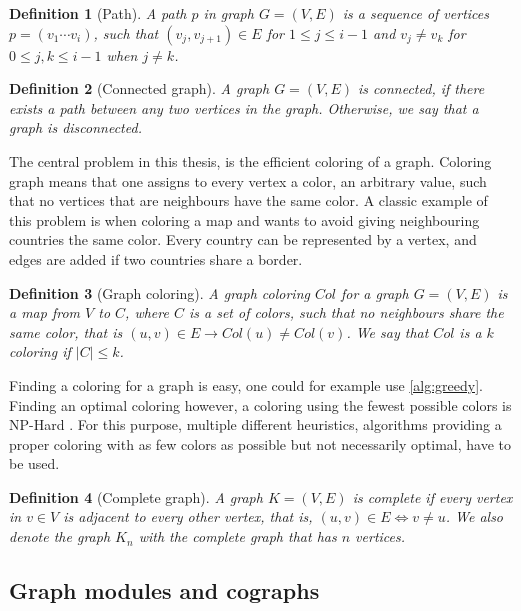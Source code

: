 \documentclass{amsart}
\newtheorem{definition}{Definition}[section]
\begin{document}
\begin{definition}[Path]
    A path $p$ in graph $G = (V,E)$ is a sequence of vertices $p = (v_1\cdots
    v_i)$, such that $(v_j,v_{j+1}) \in E$ for $1 \leq j \leq i-1$ and $v_j \neq v_k$ 
    for $0 \leq j,k \leq i-1$ when $j \neq k$.
\end{definition}

\begin{definition}[Connected graph]
    A graph $G = (V,E)$ is connected, if there exists a path between any two
    vertices in the graph. Otherwise, we say that a graph is disconnected.
\end{definition}

The central problem in this thesis, is the efficient coloring of a graph.
Coloring graph means that one assigns to every vertex a color, an arbitrary
value, such that no vertices that are neighbours have the same color. A classic
example of this problem is when coloring a map and wants to avoid giving
neighbouring countries the same color.  Every country can be represented by a
vertex, and edges are added if two countries share a border.

\begin{definition}[Graph coloring]
    A graph coloring $Col$ for a graph $G = (V,E)$ is a map from $V$ to $C$,
    where $C$ is a set of colors, such that no neighbours share the same color,
    that is $(u,v) \in E \to Col(u) \neq Col(v)$. We say that $Col$
    is a $k$ coloring if $|C| \leq k$.
\end{definition}

Finding a coloring for a graph is easy, one could for example use
\autoref{alg:greedy}. Finding an optimal coloring however, a coloring using the
fewest possible colors is NP-Hard \cite{NPHard}. For this purpose, multiple
different heuristics, algorithms providing a proper coloring with as few colors
as possible but not necessarily optimal, have to be used.

\begin{definition}[Complete graph]
    A graph $K = (V,E)$ is complete if every vertex in $v \in V$ is adjacent to
    every other vertex, that is, $ (u,v) \in E \iff v \neq u$. We also denote the graph $K_n$ with the complete graph that
    has $n$ vertices.
\end{definition}

\subsection{Graph modules and cographs}
\label{sec:GraphModules}
\end{document}
